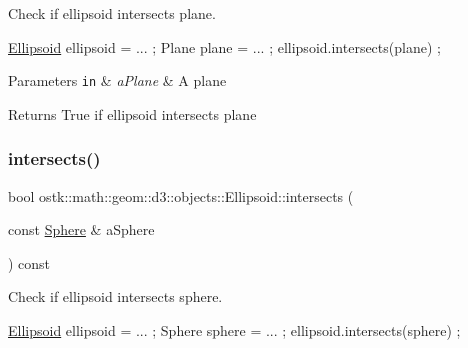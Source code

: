 Check if ellipsoid intersects plane. 


\begin{DoxyCode}
\hyperlink{classostk_1_1math_1_1geom_1_1d3_1_1objects_1_1_ellipsoid_a106c71abf9503f3d06b2613c1c7e9d65}{Ellipsoid} ellipsoid = ... ;
Plane plane = ... ;
ellipsoid.intersects(plane) ;
\end{DoxyCode}



\begin{DoxyParams}[1]{Parameters}
\mbox{\tt in}  & {\em a\+Plane} & A plane \\
\hline
\end{DoxyParams}
\begin{DoxyReturn}{Returns}
True if ellipsoid intersects plane 
\end{DoxyReturn}
\mbox{\label{classostk_1_1math_1_1geom_1_1d3_1_1objects_1_1_ellipsoid_a48ab2b6828f42a314b185709126a0c43}} 
\subsubsection{\texorpdfstring{intersects()}{intersects()}\hspace{0.1cm}{\footnotesize\ttfamily [7/10]}}
{\footnotesize\ttfamily bool ostk\+::math\+::geom\+::d3\+::objects\+::\+Ellipsoid\+::intersects (\begin{DoxyParamCaption}\item[{const \hyperlink{classostk_1_1math_1_1geom_1_1d3_1_1objects_1_1_sphere}{Sphere} \&}]{a\+Sphere }\end{DoxyParamCaption}) const}



Check if ellipsoid intersects sphere. 


\begin{DoxyCode}
\hyperlink{classostk_1_1math_1_1geom_1_1d3_1_1objects_1_1_ellipsoid_a106c71abf9503f3d06b2613c1c7e9d65}{Ellipsoid} ellipsoid = ... ;
Sphere sphere = ... ;
ellipsoid.intersects(sphere) ;
\end{DoxyCode}



